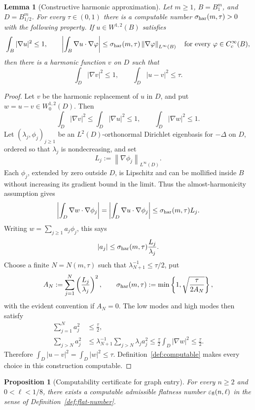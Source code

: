 \documentclass[11pt]{amsart}
\newtheorem{proposition}[theorem]{Proposition}
\newtheorem{lemma}[theorem]{Lemma}
\theoremstyle{definition}
\newcommand{\norm}[1]{\left\|#1\right\|}
\begin{document}
\begin{lemma}[Constructive harmonic approximation]\label{lem:effective-harmonic}
Let \(m\ge1\), \(B=B_1^m\), and \(D=B_{1/2}^m\).  For every
\(\tau\in(0,1)\) there is a computable number
\(\sigma_{\rm har}(m,\tau)>0\) with the following property.  If
\(u\in W^{1,2}(B)\) satisfies
\[
   \int_B|\nabla u|^2\le1,\qquad
   \left|\int_B\nabla u\cdot\nabla\varphi\right|
      \le\sigma_{\rm har}(m,\tau)
          \norm{\nabla\varphi}_{L^\infty(B)}
   \quad\text{for every }\varphi\in C_c^\infty(B),
\]
then there is a harmonic function \(v\) on \(D\) such that
\[
   \int_D|\nabla v|^2\le1,\qquad
   \int_D|u-v|^2\le\tau.
\]
\end{lemma}

\begin{proof}
Let \(v\) be the harmonic replacement of \(u\) in \(D\), and put
\(w=u-v\in W^{1,2}_0(D)\).  Then
\[
   \int_D|\nabla v|^2\le\int_D|\nabla u|^2\le1,\qquad
   \int_D|\nabla w|^2\le1.
\]
Let \((\lambda_j,\phi_j)_{j\ge1}\) be an \(L^2(D)\)-orthonormal
Dirichlet eigenbasis for \(-\Delta\) on \(D\), ordered so that
\(\lambda_j\) is nondecreasing, and set
\[
   L_j:=\norm{\nabla\phi_j}_{L^\infty(D)}.
\]
Each \(\phi_j\), extended by zero outside \(D\), is Lipschitz and can
be mollified inside \(B\) without increasing its gradient bound in
the limit.  Thus the almost-harmonicity assumption gives
\[
   \left|\int_D\nabla w\cdot\nabla\phi_j\right|
      =\left|\int_D\nabla u\cdot\nabla\phi_j\right|
      \le\sigma_{\rm har}(m,\tau)L_j.
\]
Writing \(w=\sum_{j\ge1}a_j\phi_j\), this says
\[
   |a_j|\le \sigma_{\rm har}(m,\tau)\frac{L_j}{\lambda_j}.
\]
Choose a finite \(N=N(m,\tau)\) such that
\(\lambda_{N+1}^{-1}\le\tau/2\), put
\[
   A_N:=\sum_{j=1}^{N}\left(\frac{L_j}{\lambda_j}\right)^2,
   \qquad
   \sigma_{\rm har}(m,\tau)
      :=\min\left\{1,\sqrt{\frac{\tau}{2A_N}}\right\},
\]
with the evident convention if \(A_N=0\).  The low modes and high
modes then satisfy
\[
\begin{aligned}
   \sum_{j=1}^{N}a_j^2&\le\frac{\tau}{2},\\
   \sum_{j>N}a_j^2
      &\le\lambda_{N+1}^{-1}
          \sum_{j>N}\lambda_j a_j^2
       \le\frac{\tau}{2}\int_D|\nabla w|^2
       \le\frac{\tau}{2}.
\end{aligned}
\]
Therefore \(\int_D|u-v|^2=\int_D|w|^2\le\tau\).
Definition~\ref{def:computable} makes every choice in this construction
computable.
\end{proof}

\begin{proposition}[Computability certificate for graph entry]
\label{prop:flat-number-computable}
For every \(n\ge2\) and \(0<\ell<1/8\), there exists a computable
admissible flatness number \(\varepsilon_{\rm fl}(n,\ell)\) in the
sense of Definition~\ref{def:flat-number}.
\end{proposition}
\end{document}
